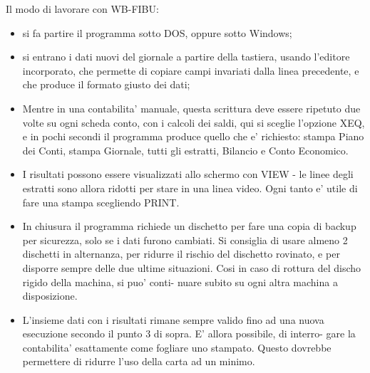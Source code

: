 \documentclass[12pt]{report}
\begin{document}
Il modo di lavorare con WB-FIBU:
\begin{itemize}
\item si fa partire il programma sotto DOS, oppure sotto Windows;

\item si entrano i dati nuovi del giornale a partire  della tastiera,
usando  l'editore incorporato, che permette di copiare  campi  invariati  dalla
linea precedente, e che produce il formato giusto dei dati;  

\item Mentre  in  una  contabilita'  manuale,  questa scrittura  deve
essere ripetuto due volte su ogni scheda conto, con i calcoli dei saldi, qui si
sceglie l'opzione XEQ,  e in pochi secondi il  programma  produce quello che e'
richiesto: stampa Piano dei Conti,  stampa Giornale,  tutti  gli estratti,
Bilancio e Conto Economico.

\item I risultati possono essere visualizzati allo schermo con VIEW - le
linee degli estratti sono allora ridotti per stare in una linea video. Ogni
tanto e' utile di fare una stampa scegliendo PRINT. 

\item In chiusura il programma richiede un dischetto per fare una copia di
backup per sicurezza, solo se i dati furono cambiati. Si consiglia di usare
almeno 2 dischetti in alternanza, per ridurre il rischio del dischetto
rovinato, e per disporre sempre delle due ultime situazioni.  Cosi in caso di
rottura del discho rigido della machina, si puo' conti- nuare subito su ogni
altra machina a disposizione.

\item L'insieme dati con i risultati rimane sempre valido fino ad una nuova
esecuzione secondo il punto 3 di sopra. E' allora possibile, di interro- gare
la contabilita' esattamente come fogliare uno stampato.  Questo dovrebbe
permettere di ridurre l'uso della carta ad un minimo.

\end{itemize}
\end{document}
